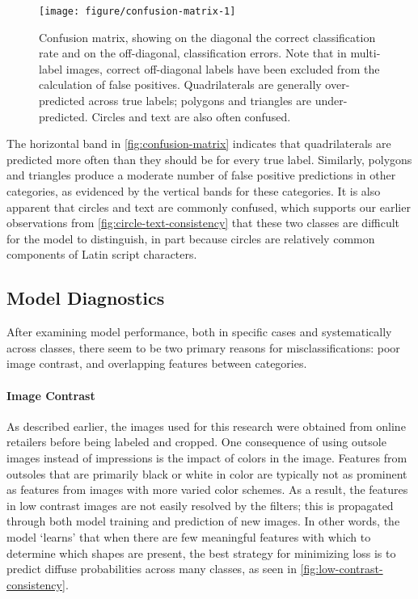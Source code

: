 \documentclass{article}\usepackage[]{graphicx}\usepackage[table]{xcolor}
\newenvironment{knitrout}{}{} %
\begin{document}
\begin{knitrout}
\color{fgcolor}\begin{figure}

{\centering \texttt{[image: figure/confusion-matrix-1]} 

}

\caption[Confusion matrix, with correct and incorrect model classifications.]{Confusion matrix, showing on the diagonal the correct classification rate and on the off-diagonal, classification errors. Note that in multi-label images, correct off-diagonal labels have been excluded from the calculation of false positives. Quadrilaterals are generally over-predicted across true labels; polygons and triangles are under-predicted. Circles and text are also often confused.}\label{fig:confusion-matrix}
\end{figure}


\end{knitrout}

The horizontal band in \autoref{fig:confusion-matrix} indicates that quadrilaterals are predicted more often than they should be for every true label. Similarly, polygons and triangles produce a moderate number of false positive predictions in other categories, as evidenced by the vertical bands for these categories. It is also apparent that circles and text are commonly confused, which supports our earlier observations from \autoref{fig:circle-text-consistency} that these two classes are difficult for the model to distinguish, in part because circles are relatively common components of Latin script characters.

\subsection{Model Diagnostics}
After examining model performance, both in specific cases and systematically across classes, there seem to be two primary reasons for misclassifications: poor image contrast, and overlapping features between categories.

\paragraph{Image Contrast}
As described earlier, the images used for this research were obtained from online retailers before being labeled and cropped. One consequence of using outsole images instead of impressions is the impact of colors in the image. Features from outsoles that are primarily black or white in color are typically not as prominent as features from images with more varied color schemes. As a result, the features in low contrast images are not easily resolved by the filters; this is propagated through both model training and prediction of new images. In other words, the model `learns' that when there are few meaningful features with which to determine which shapes are present, the best strategy for minimizing loss is to predict diffuse probabilities across many classes, as seen in \autoref{fig:low-contrast-consistency}.
\end{document}
